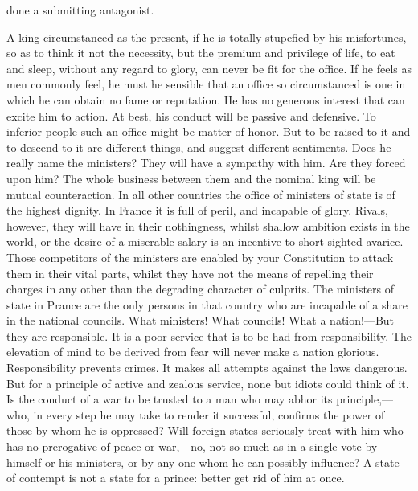 done a submitting antagonist.

A king circumstanced as the present, if he is totally stupefied by his misfortunes, so as to think it not the necessity, but the premium and privilege of life, to eat and sleep, without any regard to glory, can never be fit for the office. If he feels as men commonly feel, he must he sensible that an office so circumstanced is one in which he can obtain no fame or reputation. He has no generous interest that can excite him to action. At best, his conduct will be passive and defensive. To inferior people such an office might be matter of honor. But to be raised to it and to descend to it are different things, and suggest different sentiments. Does he really name the ministers? They will have a sympathy with him. Are they forced upon him? The whole business between them and the nominal king will be mutual counteraction. In all other countries the office of ministers of state is of the highest dignity. In France it is full of peril, and incapable of glory. Rivals, however, they will have in their nothingness, whilst shallow ambition exists in the world, or the desire of a miserable salary is an incentive to short-sighted avarice. Those competitors of the ministers are enabled by your Constitution to attack them in their vital parts, whilst they have not the means of repelling their charges in any other than the degrading character of culprits. The ministers of state in Prance are the only persons in that country who are incapable of a share in the national councils. What ministers! What councils! What a nation!—But they are responsible. It is a poor service that is to be had from responsibility. The elevation of mind to be derived from fear will never make a nation glorious. Responsibility prevents crimes. It makes all attempts against the laws dangerous. But for a principle of active and zealous service, none but idiots could think of it. Is the conduct of a war to be trusted to a man who may abhor its principle,—who, in every step he may take to render it successful, confirms the power of those by whom he is oppressed? Will foreign states seriously treat with him who has no prerogative of peace or war,—no, not so much as in a single vote by himself or his ministers, or by any one whom he can possibly influence? A state of contempt is not a state for a prince: better get rid of him at once.

